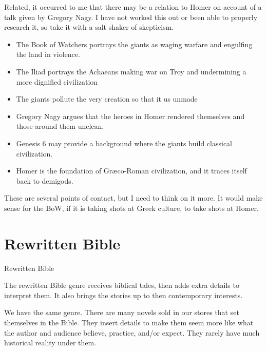 \documentclass{beamer}
\begin{document}
\begin{frame}
  Related, it occurred to me that there may be a relation to Homer on account of a talk given by Gregory Nagy.
  I have not worked this out or been able to properly research it, so take it with a salt shaker of skepticism.\pause
  \begin{itemize}
	\item The Book of Watchers portrays the giants as waging warfare and engulfing the land in violence.\pause
	\item The Iliad portrays the Achaeans making war on Troy and undermining a more dignified civilization\pause
	\item The giants pollute the very creation so that it us unmade\pause
	\item Gregory Nagy argues that the heroes in Homer rendered themselves and those around them unclean.\pause
	\item Genesis 6 may provide a background where the giants build classical civilization.\pause
	\item Homer is the foundation of Gr\ae co-Roman civilization, and it traces itself back to demigods.
  \end{itemize}
\end{frame}

\begin{frame}
  These are several points of contact, but I need to think on it more.
  It would make sense for the BoW, if it is taking shots at Greek culture, to take shots at Homer.
\end{frame}

\section{Rewritten Bible}

\begin{frame}
  \huge{Rewritten Bible}
\end{frame}

\begin{frame}
  The rewritten Bible genre receives biblical tales, then adds extra details to interpret them.
  It also brings the stories up to then contemporary interests.
\end{frame}

\begin{frame}
  We have the same genre.
  There are many novels sold in our stores that set themselves in the Bible.
  They insert details to make them seem more like what the author and audience believe, practice, and/or expect.
  They rarely have much historical reality under them.
\end{frame}
\end{document}
